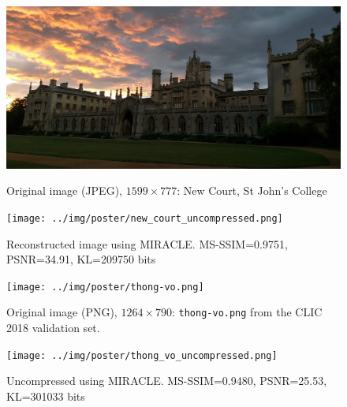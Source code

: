 \documentclass[final]{beamer}
\newlength{\onecolwid}
\newlength{\twocolwid}
\begin{document}
\begin{frame}[t]
\begin{columns}[t]
\begin{column}{\twocolwid}
\begin{figure}
\centering
\begin{minipage}[t]{.47\textwidth}
  \centering
  \includegraphics[width=\textwidth]{../img/poster/new_court.jpeg} 
  \caption{Original image (JPEG), $1599 \times 777$: New Court, St John's College}
  \label{fig:original_johns}
\end{minipage}%
\hfill
\begin{minipage}[t]{.47\textwidth}
  \centering
  \texttt{[image: ../img/poster/new\_court\_uncompressed.png]}
  \caption{Reconstructed image using MIRACLE. MS-SSIM=0.9751, PSNR=34.91, KL=209750 bits}  
  \label{fig:reconstructed_johns}
\end{minipage}
\end{figure}

\begin{figure}
\centering
\begin{minipage}[t]{.47\textwidth}
  \centering
  \texttt{[image: ../img/poster/thong-vo.png]} 
  \caption{Original image (PNG), $1264 \times 790$: \texttt{thong-vo.png} from the CLIC 2018
    validation set.}
  \label{fig:original_thong}
\end{minipage}%
\hfill
\begin{minipage}[t]{.47\textwidth}
  \centering
  \texttt{[image: ../img/poster/thong\_vo\_uncompressed.png]}
  \caption{Uncompressed using MIRACLE. MS-SSIM=0.9480, PSNR=25.53, KL=301033 bits}
  \label{fig:reconstructed_thong}
\end{minipage}
\end{figure}



\begin{columns}[t,totalwidth=\twocolwid] %

\begin{column}{\onecolwid} %


\end{column}
\end{columns}
\end{column}
\end{columns}
\end{frame}
\end{document}
